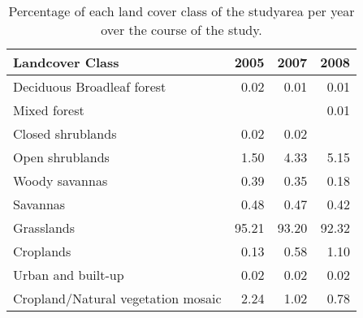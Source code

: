 \begin{table}[H]
\centering
\caption[Percentage of each LC class per year, Laikipia]{Percentage of each land cover class of the 
                                       studyarea per year over the course of the study.} 
\label{table:mlc_percentage_KEN}
\begin{tabular}{lrrr}
  \toprule
Landcover Class & 2005 & 2007 & 2008 \\ 
  \midrule
Deciduous Broadleaf forest & 0.02 & 0.01 & 0.01 \\ 
  Mixed forest &  &  & 0.01 \\ 
  Closed shrublands & 0.02 & 0.02 &  \\ 
  Open shrublands & 1.50 & 4.33 & 5.15 \\ 
  Woody savannas & 0.39 & 0.35 & 0.18 \\ 
  Savannas & 0.48 & 0.47 & 0.42 \\ 
  Grasslands & 95.21 & 93.20 & 92.32 \\ 
  Croplands & 0.13 & 0.58 & 1.10 \\ 
  Urban and built-up & 0.02 & 0.02 & 0.02 \\ 
  Cropland/Natural vegetation mosaic & 2.24 & 1.02 & 0.78 \\ 
   \bottomrule
\end{tabular}
\end{table}
